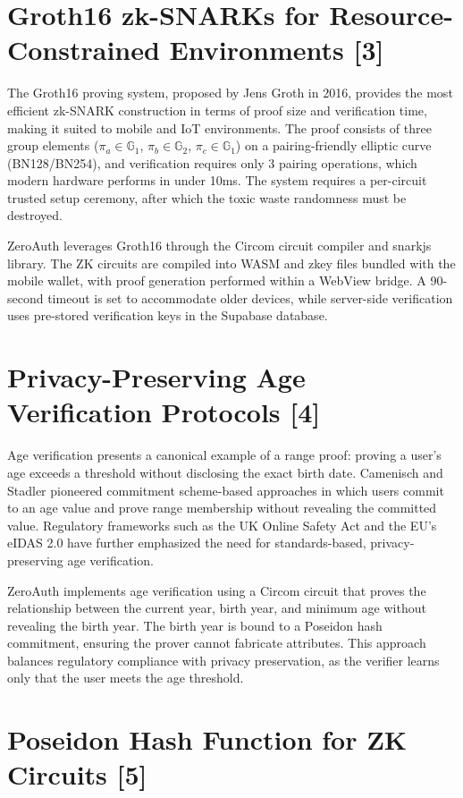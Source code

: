 \section{Groth16 zk-SNARKs for Resource-Constrained Environments [3]}

The Groth16 proving system, proposed by Jens Groth in 2016, provides the most efficient zk-SNARK construction in terms of proof size and verification time, making it suited to mobile and IoT environments. The proof consists of three group elements ($\pi_a \in \mathbb{G}_1$, $\pi_b \in \mathbb{G}_2$, $\pi_c \in \mathbb{G}_1$) on a pairing-friendly elliptic curve (BN128/BN254), and verification requires only 3 pairing operations, which modern hardware performs in under 10ms. The system requires a per-circuit trusted setup ceremony, after which the toxic waste randomness must be destroyed.

ZeroAuth leverages Groth16 through the Circom circuit compiler and snarkjs library. The ZK circuits are compiled into WASM and zkey files bundled with the mobile wallet, with proof generation performed within a WebView bridge. A 90-second timeout is set to accommodate older devices, while server-side verification uses pre-stored verification keys in the Supabase database.

\section{Privacy-Preserving Age Verification Protocols [4]}

Age verification presents a canonical example of a range proof: proving a user's age exceeds a threshold without disclosing the exact birth date. Camenisch and Stadler pioneered commitment scheme-based approaches in which users commit to an age value and prove range membership without revealing the committed value. Regulatory frameworks such as the UK Online Safety Act and the EU's eIDAS 2.0 have further emphasized the need for standards-based, privacy-preserving age verification.

ZeroAuth implements age verification using a Circom circuit that proves the relationship between the current year, birth year, and minimum age without revealing the birth year. The birth year is bound to a Poseidon hash commitment, ensuring the prover cannot fabricate attributes. This approach balances regulatory compliance with privacy preservation, as the verifier learns only that the user meets the age threshold.

\section{Poseidon Hash Function for ZK Circuits [5]}

